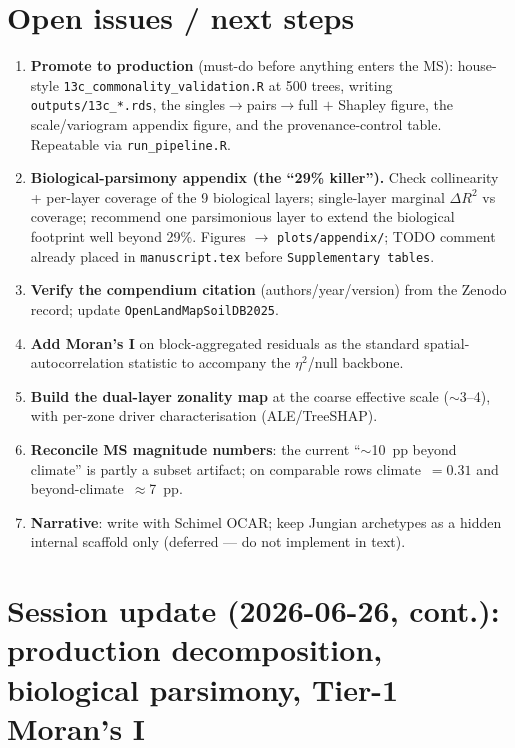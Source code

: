 \documentclass[11pt,a4paper]{article}
\begin{document}
\section{Open issues / next steps}
\begin{enumerate}\itemsep2pt
  \item \textbf{Promote to production} (must-do before anything enters the MS):
  house-style \texttt{13c\_commonality\_validation.R} at 500 trees, writing
  \texttt{outputs/13c\_*.rds}, the singles$\to$pairs$\to$full $+$ Shapley figure,
  the scale/variogram appendix figure, and the provenance-control table. Repeatable
  via \texttt{run\_pipeline.R}.
  \item \textbf{Biological-parsimony appendix (the ``29\% killer'').} Check
  collinearity + per-layer coverage of the 9 biological layers; single-layer
  marginal $\Delta R^2$ vs coverage; recommend one parsimonious layer to extend the
  biological footprint well beyond 29\%. Figures $\to$ \texttt{plots/appendix/};
  TODO comment already placed in \texttt{manuscript.tex} before
  \texttt{Supplementary tables}.
  \item \textbf{Verify the compendium citation} (authors/year/version) from the
  Zenodo record; update \texttt{OpenLandMapSoilDB2025}.
  \item \textbf{Add Moran's I} on block-aggregated residuals as the standard
  spatial-autocorrelation statistic to accompany the $\eta^2$/null backbone.
  \item \textbf{Build the dual-layer zonality map} at the coarse effective scale
  ($\sim$3--4\textdegree), with per-zone driver characterisation (ALE/TreeSHAP).
  \item \textbf{Reconcile MS magnitude numbers}: the current ``$\sim$10~pp beyond
  climate'' is partly a subset artifact; on comparable rows climate~$=0.31$ and
  beyond-climate~$\approx$7~pp.
  \item \textbf{Narrative}: write with Schimel OCAR; keep Jungian archetypes as a
  hidden internal scaffold only (deferred --- do not implement in text).
\end{enumerate}

\section{Session update (2026-06-26, cont.): production decomposition,
biological parsimony, Tier-1 Moran's I}
\end{document}
